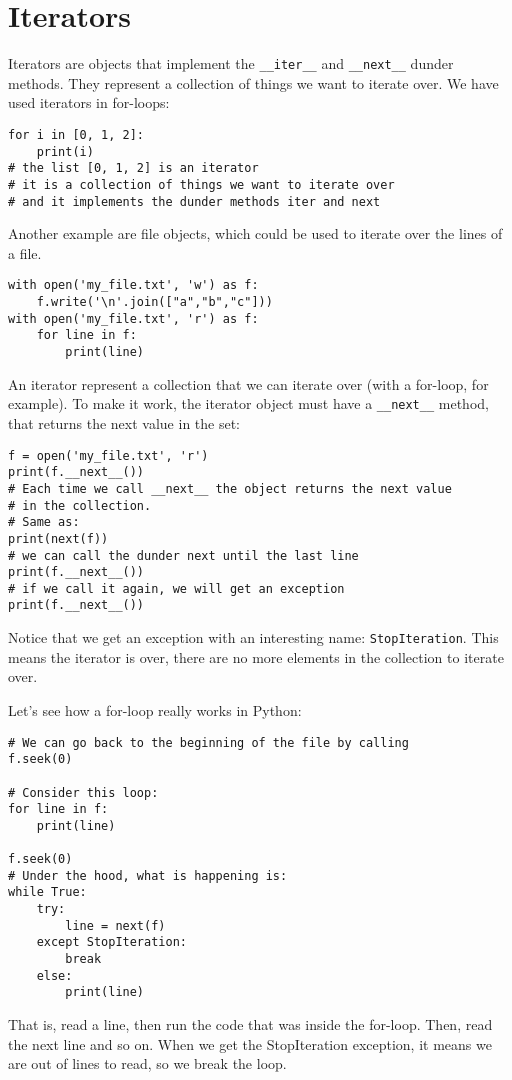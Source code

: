 \documentclass[12pt, a4paper]{article}
\begin{document}
\section{Iterators}
\label{sec:org213e0c3}
Iterators are objects that implement the \texttt{\_\_iter\_\_} and \texttt{\_\_next\_\_} dunder methods.
They represent a collection of things we want to iterate over.
We have used iterators in for-loops:
\lstset{language=jupyter-python,label= ,caption= ,captionpos=b,numbers=none}
\begin{lstlisting}
for i in [0, 1, 2]:
    print(i)
# the list [0, 1, 2] is an iterator
# it is a collection of things we want to iterate over
# and it implements the dunder methods iter and next
\end{lstlisting}
Another example are file objects, which could be used to iterate over the lines of a file.
\lstset{language=jupyter-python,label= ,caption= ,captionpos=b,numbers=none}
\begin{lstlisting}
with open('my_file.txt', 'w') as f:
    f.write('\n'.join(["a","b","c"]))
with open('my_file.txt', 'r') as f:
    for line in f:
        print(line)
\end{lstlisting}
An iterator represent a collection that we can iterate over (with a for-loop, for example).
To make it work, the iterator object must have a \texttt{\_\_next\_\_} method, that returns the next value in the set:
\lstset{language=jupyter-python,label= ,caption= ,captionpos=b,numbers=none}
\begin{lstlisting}
f = open('my_file.txt', 'r')
print(f.__next__())
# Each time we call __next__ the object returns the next value
# in the collection.
# Same as:
print(next(f))
# we can call the dunder next until the last line
print(f.__next__())
# if we call it again, we will get an exception
print(f.__next__())
\end{lstlisting}
Notice that we get an exception with an interesting name: \texttt{StopIteration}.
This means the iterator is over, there are no more elements in the collection to iterate over.

Let's see how a for-loop really works in Python:
\lstset{language=jupyter-python,label= ,caption= ,captionpos=b,numbers=none}
\begin{lstlisting}
# We can go back to the beginning of the file by calling
f.seek(0)

# Consider this loop:
for line in f:
    print(line)

f.seek(0)
# Under the hood, what is happening is:
while True:
    try:
        line = next(f)
    except StopIteration:
        break
    else:
        print(line)
\end{lstlisting}
That is, read a line, then run the code that was inside the for-loop.
Then, read the next line and so on.
When we get the StopIteration exception, it means we are out of lines to read, so we break the loop.
\end{document}
